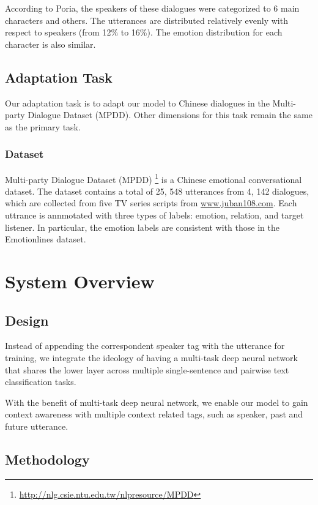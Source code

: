 \documentclass[11pt]{article}
\begin{document}
According to Poria, the speakers of these dialogues were categorized to 6 main characters and others. The utterances are distributed relatively evenly with respect to speakers (from 12\% to 16\%).  The emotion distribution for each character is also similar. 


\subsection{Adaptation Task}
\label{sect:adaptation_task}

Our adaptation task is to adapt our model to Chinese dialogues in the Multi-party Dialogue Dataset (MPDD). Other dimensions for this task remain the same as the primary task.

\subsubsection{Dataset}

Multi-party Dialogue Dataset (MPDD) \citep{chen-etal-2020-mpdd} \footnote{\url{http://nlg.csie.ntu.edu.tw/nlpresource/MPDD}} is a Chinese emotional conversational dataset. The dataset contains a total of 25, 548 utterances from 4, 142 dialogues, which are collected from five TV series scripts from \url{www.juban108.com}. Each uttrance is annmotated with three types of labels: emotion, relation, and target listener. In particular, the emotion labels are consistent with those in the Emotionlines dataset.


\section{System Overview}
\label{sec:overview}

\subsection{Design}

Instead of appending the correspondent speaker tag with the utterance for training, we integrate the ideology of having a multi-task deep neural network that shares the lower layer across multiple single-sentence and pairwise text classification tasks. 

With the benefit of multi-task deep neural network, we enable our model to gain context awareness with multiple context related tags, such as speaker, past and future utterance.

\subsection{Methodology}
\end{document}
